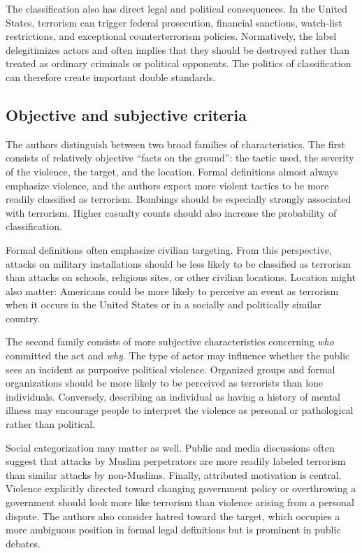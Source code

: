 The classification also has direct legal and political consequences. In the United States, terrorism can trigger federal prosecution, financial sanctions, watch-list restrictions, and exceptional counterterrorism policies. Normatively, the label delegitimizes actors and often implies that they should be destroyed rather than treated as ordinary criminals or political opponents. The politics of classification can therefore create important double standards.

\subsection{Objective and subjective criteria}

The authors distinguish between two broad families of characteristics. The first consists of relatively objective ``facts on the ground'': the tactic used, the severity of the violence, the target, and the location. Formal definitions almost always emphasize violence, and the authors expect more violent tactics to be more readily classified as terrorism. Bombings should be especially strongly associated with terrorism. Higher casualty counts should also increase the probability of classification.

Formal definitions often emphasize civilian targeting. From this perspective, attacks on military installations should be less likely to be classified as terrorism than attacks on schools, religious sites, or other civilian locations. Location might also matter: Americans could be more likely to perceive an event as terrorism when it occurs in the United States or in a socially and politically similar country.

The second family consists of more subjective characteristics concerning \textit{who} committed the act and \textit{why}. The type of actor may influence whether the public sees an incident as purposive political violence. Organized groups and formal organizations should be more likely to be perceived as terrorists than lone individuals. Conversely, describing an individual as having a history of mental illness may encourage people to interpret the violence as personal or pathological rather than political.

Social categorization may matter as well. Public and media discussions often suggest that attacks by Muslim perpetrators are more readily labeled terrorism than similar attacks by non-Muslims. Finally, attributed motivation is central. Violence explicitly directed toward changing government policy or overthrowing a government should look more like terrorism than violence arising from a personal dispute. The authors also consider hatred toward the target, which occupies a more ambiguous position in formal legal definitions but is prominent in public debates.

